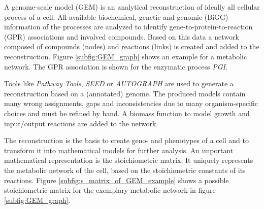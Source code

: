 % 

A genome-scale model (GEM) is an analytical reconstruction of ideally all cellular process of a cell.
All available biochemical, genetic and genomic (BiGG) information of the processes are analyzed to
identify gene-to-protein-to-reaction (GPR) associations and involved compounds. 
Based on this data a network composed of compounds (nodes) and reactions (links) is created and added
to the reconstruction\cite{palsson2015systems}. Figure \ref{subfig:GEM_graph} shows an example for a
metabolic network. The GPR association is shown for the enzymatic process \textit{PGI}.

Tools like \textit{Pathway Tools}\cite{karp2009pathway},
\textit{SEED}\cite{henry2010high} or \textit{AUTOGRAPH}\cite{notebaart2006accelerating} are used to
generate a reconstruction based on a (annotated) genome. The produced models contain many
wrong assignments, gaps and inconsistencies due to many organism-specific choices and must be refined by hand.
A biomass function to model growth and input/output reactions are added to
the network\cite{santos_practical_2011}.

The reconstruction is the basis to create geno- and phenotypes of a cell and to transform it into
mathematical models for further analysis.
An important mathematical representation is the stoichiometric matrix. It uniquely represents the metabolic
network of the cell, based on the stoichiometric constants of its reactions\cite{palsson2015systems}.
Figure \ref{subfig:s_matrix_of_GEM_example} shows a possible stoichiometric matrix for the exemplary
metabolic network in figure \ref{subfig:GEM_graph}.

